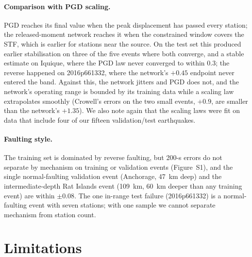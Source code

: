 \documentclass[12pt,letterpaper]{article}
\begin{document}
\paragraph{Comparison with PGD scaling.} PGD reaches its final value when the peak displacement has passed every station; the released-moment network reaches it when the constrained window covers the STF, which is earlier for stations near the source. On the test set this produced earlier stabilisation on three of the five events where both converge, and a stable estimate on Iquique, where the PGD law never converged to within 0.3; the reverse happened on 2016p661332, where the network's $+0.45$ endpoint never entered the band. Against this, the network jitters and PGD does not, and the network's operating range is bounded by its training data while a scaling law extrapolates smoothly (Crowell's errors on the two small events, $+0.9$, are smaller than the network's $+1.35$). We also note again that the scaling laws were fit on data that include four of our fifteen validation/test earthquakes.

\paragraph{Faulting style.} The training set is dominated by reverse faulting, but 200-s errors do not separate by mechanism on training or validation events (Figure~S1), and the single normal-faulting validation event (Anchorage, 47~km deep) and the intermediate-depth Rat Islands event (109~km, 60~km deeper than any training event) are within $\pm0.08$. The one in-range test failure (2016p661332) is a normal-faulting event with seven stations; with one sample we cannot separate mechanism from station count.

\section{Limitations}
\end{document}
